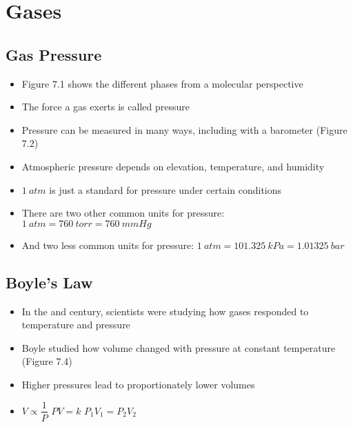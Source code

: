 \documentclass[12pt, openany, letterpaper]{memoir}
\begin{document}
\setcounter{chapter}{6}  %
\chapter{Gases}
\section{Gas Pressure}
\begin{itemize}
	\item Figure 7.1 shows the different phases from a molecular perspective
	\item The force a gas exerts is called pressure
	\item Pressure can be measured in many ways, including with a barometer (Figure 7.2)
	\item Atmospheric pressure depends on elevation, temperature, and humidity
	\item $1~atm$ is just a standard for pressure under certain conditions
	\item There are two other common units for pressure: $1~atm=760~torr=760~mmHg$
	\item And two less common units for pressure: $1~atm=101.325~kPa=1.01325~bar$
\end{itemize}
\section{Boyle's Law}
\begin{itemize}
	\item In the  and  century, scientists were studying how gases responded to temperature and pressure
	\item Boyle studied how volume changed with pressure at constant temperature (Figure 7.4)
	\item Higher pressures lead to proportionately lower volumes
	\item $V\propto \dfrac{1}{P}$ \hspace{2em} $PV=k$ \hspace{2em} $P_1V_1=P_2V_2$
\end{itemize}
\end{document}
